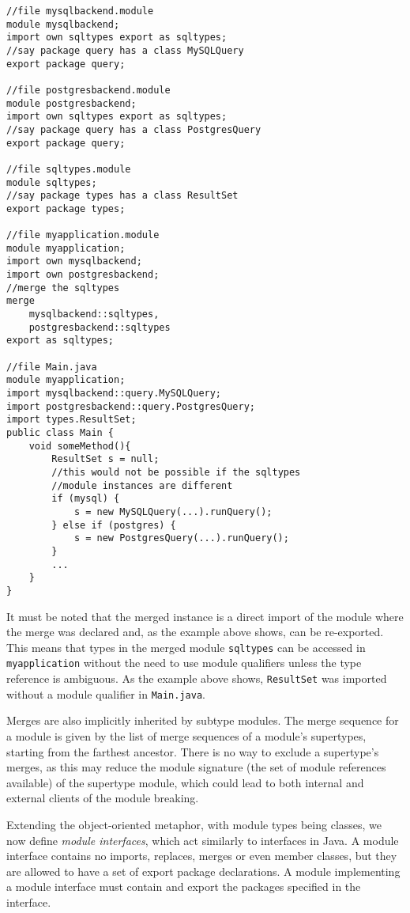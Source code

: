 \begin{lstlisting}[caption=Merge]
//file mysqlbackend.module
module mysqlbackend;
import own sqltypes export as sqltypes;
//say package query has a class MySQLQuery
export package query;

//file postgresbackend.module
module postgresbackend;
import own sqltypes export as sqltypes;
//say package query has a class PostgresQuery
export package query;

//file sqltypes.module
module sqltypes;
//say package types has a class ResultSet
export package types;

//file myapplication.module
module myapplication;
import own mysqlbackend;
import own postgresbackend;
//merge the sqltypes
merge 
	mysqlbackend::sqltypes, 
	postgresbackend::sqltypes 
export as sqltypes;

//file Main.java
module myapplication;
import mysqlbackend::query.MySQLQuery;
import postgresbackend::query.PostgresQuery;
import types.ResultSet;
public class Main {
	void someMethod(){
		ResultSet s = null;
		//this would not be possible if the sqltypes
		//module instances are different
		if (mysql) {
			s = new MySQLQuery(...).runQuery();
		} else if (postgres) {
			s = new PostgresQuery(...).runQuery();
		}
		...
	}
}
\end{lstlisting}


It must be noted that the merged instance is a direct import of
the module where the merge was declared and, as the example above shows,
can be re-exported. This means that types in the merged module {\tt sqltypes} 
can be accessed in {\tt myapplication} without the need to use module 
qualifiers unless the type reference is ambiguous. As the example above
shows, {\tt ResultSet} was imported without a module qualifier in
{\tt Main.java}.

Merges are also implicitly inherited by subtype modules. The merge sequence for
a module is given by the list of merge sequences of a module's supertypes, starting
from the farthest ancestor. There is no way to exclude a supertype's merges, as
this may reduce the module signature (the set of module references available) of
the supertype module, which could lead to both internal and external clients of
the module breaking.




Extending the object-oriented metaphor, with module types being classes, we 
now define \textit{module interfaces}, which act similarly to interfaces in Java. A module
interface contains no imports, replaces, merges or even member classes, but they
are allowed to have a set of export package declarations. A module implementing
a module interface must contain and export the packages specified in the interface.

